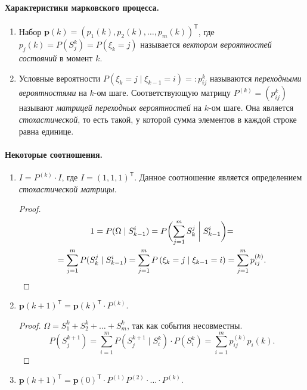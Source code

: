\paragraph{Характеристики марковского процесса.}
\begin{enumerate}
  \item Набор $\mathbf{p}(k) = \left( p_1 (k), p_2(k), \dots, p_m(k)\right)^{\mathsf T} $,
    где $p_j(k) = P(S_j^k) = P(\xi_k = j)$ называется \emph{вектором
    вероятностей состояний} в
    момент $ k $.

  \item Условные вероятности $P(\xi_k = j \mid \xi_{k-1} = i) =: p_{ij}^{k}$
    называются \emph{переходными вероятностями} на $k$-ом шаге.
    Соответствующую матрицу $P^{(k)} = (p_{ij}^k)$ называют \emph{матрицей переходных
  вероятностей} на $k$-ом шаге. Она является
    \emph{стохастической}, то есть такой, у которой сумма элементов в каждой строке равна
    единице.
\end{enumerate}

\paragraph{Некоторые соотношения.}
\begin{enumerate}
  \item $I = P^{(k)} \cdot I$, где $I = \left( 1 , 1 , 1 \right)^{\mathsf T} $. 
    Данное соотношение является определением \emph{стохастической матрицы}.
    \begin{proof}
      \begin{multline*}
        1 = P(\Omega \mid S_{k-1}^i) = P\biggl(\sum_{j=1}^m S_k^j \biggm|
          S_{k-1}^i\biggl)
        = \\ =
        \sum_{j=1}^m P(S_k^j \mid S_{k-1}^i)
        = \sum_{j=1}^m P\left(\xi_k = j \mid \xi_{k-1}=i\right) = \sum_{j=1}^m
        p_{ij}^{(k)}.
      \end{multline*}
    \end{proof}

  \item $\mathbf{p} (k+1) ^{\mathsf T} = \mathbf{p}(k)^{\mathsf T} \cdot P^{(k)}$.
    \begin{proof}
      $\Omega = S_1^k + S_2^k + \ldots + S_m^k$, так как события несовместны.
    \[
      P(S_j^{k+1}) = \sum_{i=1}^m P(S_j^{k+1} \mid S_i^k) \cdot P(S_i^k)
      = \sum_{i=1}^m p_{ij}^{(k)} p_i(k).
    \]
    \end{proof}

  \item $\mathbf{p} (k+1)^{\mathsf T} = \mathbf{p}(0)^{\mathsf T} \cdot P^{(1)} P^{(2)} \cdot \ldots \cdot P^{(k)}$.
\end{enumerate}



